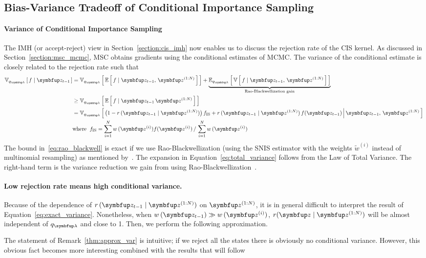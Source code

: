 \subsection{Bias-Variance Tradeoff of Conditional Importance Sampling}\label{section:bias_variance}
\paragraph{Variance of Conditional Importance Sampling}
The IMH (or accept-reject) view in Section~\ref{section:cis_imh} now enables us to discuss the rejection rate of the CIS kernel.
As discussed in Section~\ref{section:msc_mcmc}, MSC obtains gradients using the conditional estimates of MCMC.
The variance of the conditional estimate is closely related to the rejection rate such that
\begin{align}
  \Vsub{q_{\vlambda}}{f \mid \vz_{t-1}} &= \Vsub{q_{\vlambda}}{ \E{ f \mid \vz_{t-1},\,\vz^{(1:N)} } } + \underbrace{\Esub{q_{\vlambda}}{ \V{ f \mid \vz_{t-1},\,\vz^{(1:N)} } }}_{\text{Rao-Blackwellization gain}} \label{eq:total_variance} \\
  &\geq \Vsub{q_{\vlambda}}{ \E{ f \mid \vz_{t-1}\,\vz^{(1:N)} } } \label{eq:rao_blackwell}\\
  &= \Vsub{q_{\vlambda}}{ \big(1 - r\,(\vz_{t-1}\mid\vz^{(1:N)})\big)\, f_{\mathrm{IS}}
    + r\,(\vz_{t-1}\mid\vz^{(1:N)})\,f(\vz_{t-1}) \,\middle\vert\, \vz_{t-1},\, \vz^{(1:N)} } \label{eq:exact_variance} \\
  &\text{where}\;\; f_{\mathrm{IS}} = {\sum_{i=1}^N w\,(\vz^{(i)}) f(\vz^{(i)})\,/\,\sum_{i=1}^N w\,(\vz^{(i)})} \nonumber 
\end{align}
%
The bound in~\eqref{eq:rao_blackwell} is exact if we use Rao-Blackwellization (using the SNIS estimator with the weights \(\widetilde{w}^{(i)}\) instead of multinomial resampling) as mentioned by~\citet{NEURIPS2020_b2070693}.
The expansion in Equation~\eqref{eq:total_variance} follows from the Law of Total Variance.
The right-hand term is the variance reduction we gain from using Rao-Blackwellization~\citep{bernton_locally_2015}.

\paragraph{Low rejection rate means high conditional variance.}
Because of the dependence of \(r\,(\vz_{t-1}\mid\vz^{(1:N)})\) on \(\vz^{(1:N)}\), it is in general difficult to interpret the result of Equation~\eqref{eq:exact_variance}.
Nonetheless, when \(w\,(\vz_{t-1}) \gg w\,(\vz^{(i)})\), \(r(\vz\mid\vz^{(1:N)})\) will be almost independent of \(q_{\vlambda}\) and close to 1.
Then, we perform the following approximation.
%

%
The statement of Remark~\ref{thm:approx_var} is intuitive; if we reject all the states there is obviously no conditional variance.
However, this obvious fact becomes more interesting combined with the results that will follow

